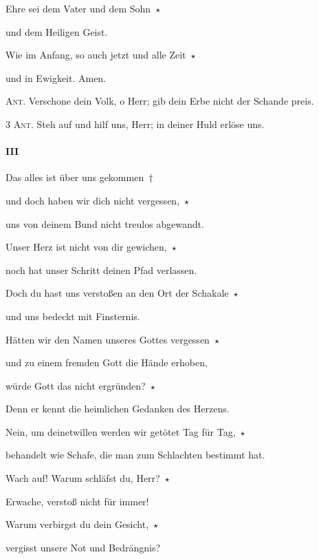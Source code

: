 \noindent Ehre sei dem Vater und dem Sohn~$\star$~\nopagebreak

und dem Heiligen Geist.

\noindent Wie im Anfang, so auch jetzt und alle Zeit~$\star$~\nopagebreak

und in Ewigkeit. Amen.

\vspace{10pt}

\noindent \textsc{Ant.} Verschone dein Volk, o Herr; gib dein Erbe nicht der Schande preis. \vspace{10pt}

\noindent \textsc{3 Ant.} Steh auf und hilf uns, Herr; in deiner Huld erlöse uns.

\paragraph{III}

\noindent Das alles ist über uns gekommen~†~\nopagebreak

und doch haben wir dich nicht vergessen,~$\star$~\nopagebreak

uns von deinem Bund nicht treulos abgewandt.

\noindent Unser Herz ist nicht von dir gewichen,~$\star$~\nopagebreak

noch hat unser Schritt deinen Pfad verlassen.

\noindent Doch du hast uns verstoßen an den Ort der Schakale~$\star$~\nopagebreak

und uns bedeckt mit Finsternis.

\noindent Hätten wir den Namen unseres Gottes vergessen~$\star$~\nopagebreak

und zu einem fremden Gott die Hände erhoben,

\noindent würde Gott das nicht ergründen?~$\star$~\nopagebreak

Denn er kennt die heimlichen Gedanken des Herzens.

\noindent Nein, um deinetwillen werden wir getötet Tag für Tag,~$\star$~\nopagebreak

behandelt wie Schafe, die man zum Schlachten bestimmt hat. 

 \noindent Wach auf! Warum schläfst du, Herr?~$\star$~\nopagebreak

Erwache, verstoß nicht für immer! 

 \noindent Warum verbirgst du dein Gesicht,~$\star$~\nopagebreak

vergisst unsere Not und Bedrängnis? 

